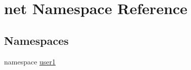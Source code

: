 \hypertarget{namespacenet}{\section{net \-Namespace \-Reference}
\label{namespacenet}
}
\subsection*{\-Namespaces}
\begin{DoxyCompactItemize}
\item 
namespace \hyperlink{namespacenet_1_1user1}{user1}
\end{DoxyCompactItemize}

